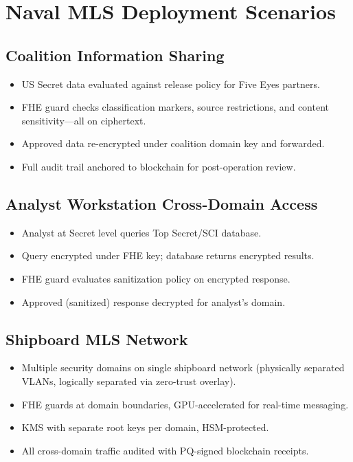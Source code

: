 \documentclass[11pt,letterpaper]{article}
\begin{document}
\section{Naval MLS Deployment Scenarios}

\subsection{Coalition Information Sharing}

\begin{itemize}
\item US Secret data evaluated against release policy for Five Eyes partners.
\item FHE guard checks classification markers, source restrictions, and content sensitivity---all on ciphertext.
\item Approved data re-encrypted under coalition domain key and forwarded.
\item Full audit trail anchored to blockchain for post-operation review.
\end{itemize}

\subsection{Analyst Workstation Cross-Domain Access}

\begin{itemize}
\item Analyst at Secret level queries Top Secret/SCI database.
\item Query encrypted under FHE key; database returns encrypted results.
\item FHE guard evaluates sanitization policy on encrypted response.
\item Approved (sanitized) response decrypted for analyst's domain.
\end{itemize}

\subsection{Shipboard MLS Network}

\begin{itemize}
\item Multiple security domains on single shipboard network (physically separated VLANs, logically separated via zero-trust overlay).
\item FHE guards at domain boundaries, GPU-accelerated for real-time messaging.
\item KMS with separate root keys per domain, HSM-protected.
\item All cross-domain traffic audited with PQ-signed blockchain receipts.
\end{itemize}
\end{document}
